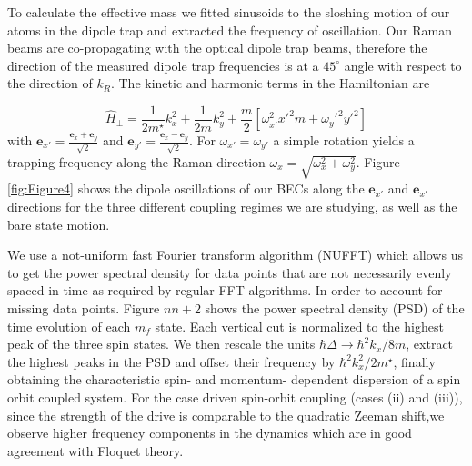 To calculate the effective mass we fitted sinusoids to the sloshing motion of our atoms in the dipole trap and extracted the frequency of oscillation. Our Raman beams are co-propagating with the optical dipole trap beams, therefore the direction of the measured dipole trap frequencies is at a $45^{\circ}$ angle with respect to the direction of $k_R$. The kinetic and harmonic terms in the Hamiltonian are

\begin{equation}
\hat{H}_{\perp}=\frac{1}{2m^{\star}}k_x^2 + \frac{1}{2m}k_y^2+\frac{m}{2}[\omega_{x'}^2x'^2m+\omega_y'^2y'^2]
\end{equation}
%
with $\mathbf{e}_{x'}=\frac{\mathbf{e}_{x}+\mathbf{e}_{y}}{\sqrt{2}}$ and  $\mathbf{e}_{y'}=\frac{\mathbf{e}_{x}-\mathbf{e}_{y}}{\sqrt{2}}$. For $\omega_{x'}=\omega_{y'}$ a simple rotation yields a trapping frequency along the Raman direction $\omega_x=\sqrt{\omega_x^2+\omega_y^2}$.   
Figure \ref{fig:Figure4} shows the dipole oscillations of our BECs along the $\mathbf{e}_{x'}$ and $\mathbf{e}_{x'}$ directions for the three different coupling regimes we are studying, as well as the bare state motion. 



We use a not-uniform fast Fourier transform algorithm (NUFFT) which allows us to get the power spectral density for data points that are not necessarily evenly spaced in time as required by regular FFT algorithms. In order to account for missing data points. Figure $nn+2$ shows the power spectral density (PSD) of the time evolution of each $m_f$ state. Each vertical cut is normalized to the highest peak of the three spin states. We then rescale the units $\hbar\Delta\rightarrow	 \hbar^2k_x/8m$, extract the highest peaks in the PSD and offset their frequency by $\hbar^2k_x^2/2m^{\star}$, finally obtaining the characteristic spin- and momentum- dependent dispersion of a spin orbit coupled system. For the case driven spin-orbit coupling (cases (ii) and (iii)), since the strength of the drive is comparable to the quadratic Zeeman shift,we observe higher frequency components in the dynamics which are in good agreement with Floquet theory.

